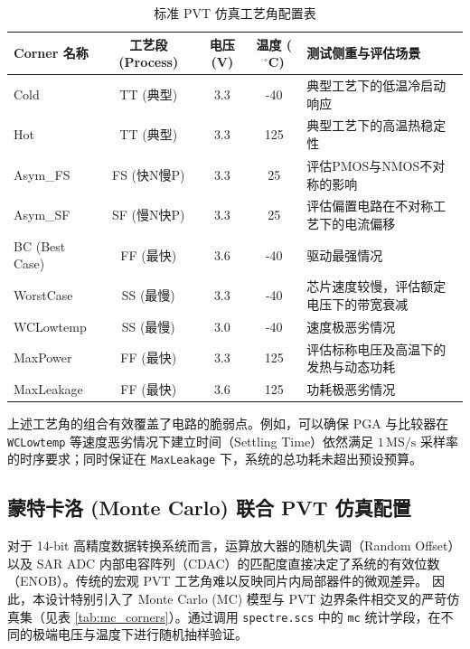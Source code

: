 \begin{table}[H]
    \centering
    \caption{标准 PVT 仿真工艺角配置表}
    \begin{tabular}{lcccl}
        \toprule
        \textbf{Corner 名称} & \textbf{工艺段 (Process)} & \textbf{电压 (V)} & \textbf{温度 ($^\circ$C)} & \textbf{测试侧重与评估场景} \\
        \midrule
        Cold & TT (典型) & 3.3 & -40 & 典型工艺下的低温冷启动响应 \\
        Hot & TT (典型) & 3.3 & 125 & 典型工艺下的高温热稳定性 \\
        Asym\_FS & FS (快N慢P) & 3.3 & 25 & 评估PMOS与NMOS不对称的影响 \\
        Asym\_SF & SF (慢N快P) & 3.3 & 25 & 评估偏置电路在不对称工艺下的电流偏移 \\
        BC (Best Case) & FF (最快) & 3.6 & -40 & 驱动最强情况 \\
        WorstCase & SS (最慢) & 3.3 & -40 & 芯片速度较慢，评估额定电压下的带宽衰减 \\
        WCLowtemp & SS (最慢) & 3.0 & -40 & 速度极恶劣情况 \\
        MaxPower & FF (最快) & 3.3 & 125 & 评估标称电压及高温下的发热与动态功耗 \\
        MaxLeakage & FF (最快) & 3.6 & 125 & 功耗极恶劣情况 \\
        \bottomrule
    \end{tabular}
    \label{tab:standard_corners}
\end{table}
上述工艺角的组合有效覆盖了电路的脆弱点。例如，可以确保 PGA 与比较器在 \texttt{WCLowtemp} 等速度恶劣情况下建立时间（Settling Time）依然满足 $1\,\text{MS/s}$ 采样率的时序要求；同时保证在 \texttt{MaxLeakage} 下，系统的总功耗未超出预设预算。

\subsection{蒙特卡洛 (Monte Carlo) 联合 PVT 仿真配置}
对于 14-bit 高精度数据转换系统而言，运算放大器的随机失调（Random Offset）以及 SAR ADC 内部电容阵列（CDAC）的匹配度直接决定了系统的有效位数（ENOB）。传统的宏观 PVT 工艺角难以反映同片内局部器件的微观差异。
因此，本设计特别引入了 Monte Carlo (MC) 模型与 PVT 边界条件相交叉的严苛仿真集（见表 \ref{tab:mc_corners}）。通过调用 \texttt{spectre.scs} 中的 \texttt{mc} 统计学段，在不同的极端电压与温度下进行随机抽样验证。

